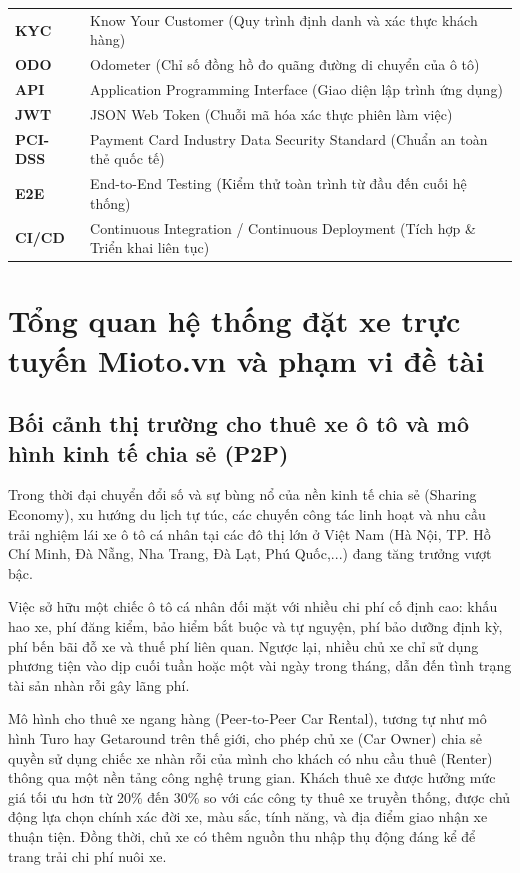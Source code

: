 \documentclass[12pt,a4paper,oneside]{report}
\begin{document}
\begin{table}[ht]
\begin{tabularx}{\textwidth}{lX}
    \textbf{KYC} & Know Your Customer (Quy trình định danh và xác thực khách hàng) \\
    \textbf{ODO} & Odometer (Chỉ số đồng hồ đo quãng đường di chuyển của ô tô) \\
    \textbf{API} & Application Programming Interface (Giao diện lập trình ứng dụng) \\
    \textbf{JWT} & JSON Web Token (Chuỗi mã hóa xác thực phiên làm việc) \\
    \textbf{PCI-DSS} & Payment Card Industry Data Security Standard (Chuẩn an toàn thẻ quốc tế) \\
    \textbf{E2E} & End-to-End Testing (Kiểm thử toàn trình từ đầu đến cuối hệ thống) \\
    \textbf{CI/CD} & Continuous Integration / Continuous Deployment (Tích hợp \& Triển khai liên tục) \\
    \bottomrule
  \end{tabularx}
\end{table}

\newpage
{}

\chapter{Tổng quan hệ thống đặt xe trực tuyến Mioto.vn và phạm vi đề tài}

\section{Bối cảnh thị trường cho thuê xe ô tô và mô hình kinh tế chia sẻ (P2P)}
Trong thời đại chuyển đổi số và sự bùng nổ của nền kinh tế chia sẻ (Sharing Economy), xu hướng du lịch tự túc, các chuyến công tác linh hoạt và nhu cầu trải nghiệm lái xe ô tô cá nhân tại các đô thị lớn ở Việt Nam (Hà Nội, TP. Hồ Chí Minh, Đà Nẵng, Nha Trang, Đà Lạt, Phú Quốc,...) đang tăng trưởng vượt bậc. 

Việc sở hữu một chiếc ô tô cá nhân đối mặt với nhiều chi phí cố định cao: khấu hao xe, phí đăng kiểm, bảo hiểm bắt buộc và tự nguyện, phí bảo dưỡng định kỳ, phí bến bãi đỗ xe và thuế phí liên quan. Ngược lại, nhiều chủ xe chỉ sử dụng phương tiện vào dịp cuối tuần hoặc một vài ngày trong tháng, dẫn đến tình trạng tài sản nhàn rỗi gây lãng phí.

Mô hình cho thuê xe ngang hàng (Peer-to-Peer Car Rental), tương tự như mô hình Turo hay Getaround trên thế giới, cho phép chủ xe (Car Owner) chia sẻ quyền sử dụng chiếc xe nhàn rỗi của mình cho khách có nhu cầu thuê (Renter) thông qua một nền tảng công nghệ trung gian. Khách thuê xe được hưởng mức giá tối ưu hơn từ 20\% đến 30\% so với các công ty thuê xe truyền thống, được chủ động lựa chọn chính xác đời xe, màu sắc, tính năng, và địa điểm giao nhận xe thuận tiện. Đồng thời, chủ xe có thêm nguồn thu nhập thụ động đáng kể để trang trải chi phí nuôi xe.
\end{document}
